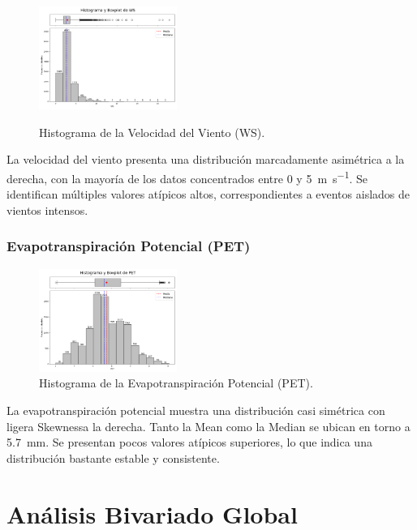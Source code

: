 \begin{figure}[H]
    \caption{Histograma de la Velocidad del Viento (WS).}
    \centering
    \includegraphics[width=0.4\textwidth]{resultados/global/univariado/WS_histograma.png}
    \label{fig:WS_histograma}
\end{figure}

La velocidad del viento presenta una distribución marcadamente asimétrica a la derecha, con la mayoría de los datos concentrados entre 0 y \SI{5}{\meter\per\second}. Se identifican múltiples valores atípicos altos, correspondientes a eventos aislados de vientos intensos.

\newpage



\subsubsection{Evapotranspiración Potencial (PET)}

\begin{figure}[H]
    \centering
    \includegraphics[width=0.4\textwidth]{resultados/global/univariado/PET_histograma.png}
    \caption{Histograma de la Evapotranspiración Potencial (PET).}
    \label{fig:PET_histograma}
\end{figure}

La evapotranspiración potencial muestra una distribución casi simétrica con ligera Skewnessa la derecha. Tanto la Mean como la Median se ubican en torno a \SI{5.7}{\milli\meter}. Se presentan pocos valores atípicos superiores, lo que indica una distribución bastante estable y consistente.

\section{Análisis Bivariado Global}

